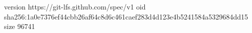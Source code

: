 version https://git-lfs.github.com/spec/v1
oid sha256:1a0e7376ef44cbb26af64c8d6c461caef283d4d123e4b5241584a5329684dd15
size 96741
